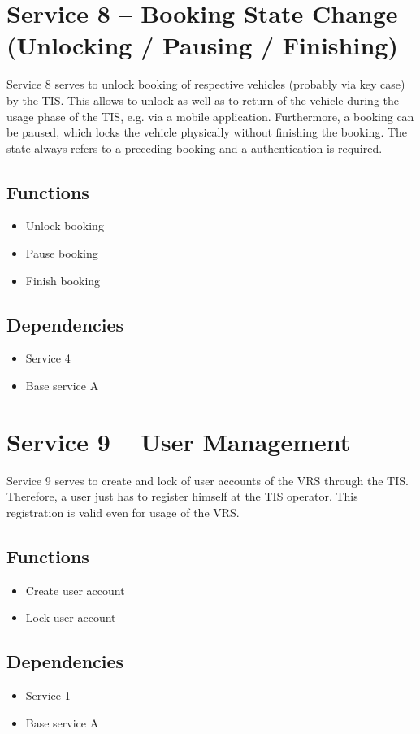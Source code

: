 \section{Service 8 -- Booking State Change (Unlocking / Pausing / Finishing)}
Service 8 serves to unlock booking of respective vehicles (probably via key case) by the TIS. This allows to unlock as well as to return of the vehicle during the usage phase of the TIS, e.g. via a mobile application. Furthermore, a booking can be paused, which locks the vehicle physically without finishing the booking. 
The state always refers to a preceding booking and a authentication is required.  

\subsection*{Functions}
\begin{itemize}
\item Unlock booking
\item Pause booking 
\item Finish booking 
\end{itemize}

\subsection*{Dependencies}
\begin{itemize}
\item Service 4
\item Base service A
\end{itemize}

\section{Service 9 -- User Management}
Service 9 serves to create and lock of user accounts of the VRS through the TIS. Therefore, a user just has to register himself at the TIS operator. This registration is valid even for usage of the VRS.

\subsection*{Functions}
\begin{itemize}
\item Create user account
\item Lock user account
\end{itemize}

\subsection*{Dependencies}
\begin{itemize}
\item Service 1
\item Base service A
\end{itemize}


